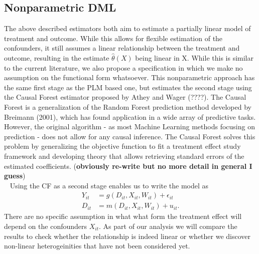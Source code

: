 \subsection{Nonparametric DML}
The above described estimators both aim to estimate a partially linear model of treatment and outcome. While this allows for flexible estimation of the confounders, it still assumes a linear relationship between the treatment and outcome, resulting in the estimate $\hat{\theta}(X)$ being linear in X. While this is similar to the current literature, we also propose a specification in which we make no assumption on the functional form whatsoever. This nonparametric approach has the same first stage as the PLM based one, but estimates the second stage using the Causal Forest estimator proposed by Athey and Wager (????). The Causal Forest is a generalization of the Random Forest prediction method developed by Breimann (2001), which has found application in a wide array of predictive tasks. However, the original algorithm - as most Machine Learning methods focusing on prediction - does not allow for any causal inference. The Causal Forest solves this problem by generalizing the objective function to fit a treatment effect study framework and developing theory that allows retrieving standard errors of the estimated coefficients. (\textbf{obviously re-write but no more detail in general I guess}) \\ 
Using the CF as a second stage enables us to write the model as 
\begin{align*}
    Y_{it}&=g(D_{it}, X_{it}, W_{it})+\epsilon_{it} \\ 
    D_{it}&=m(D_{it}, X_{it}, W_{it})+u_{it}.
\end{align*}
There are no specific assumption in what what form the treatment effect will depend on the confounders $X_{it}$. As part of our analysis we will compare the results to check whether the relationship is indeed linear or whether we discover non-linear heterogeinities that have not been considered yet. 

